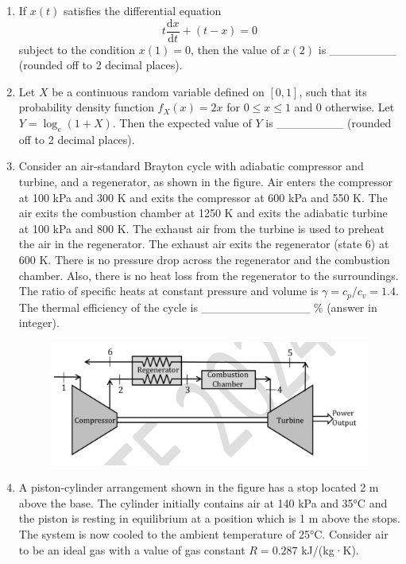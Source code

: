 \documentclass[journal,11pt,onecolumn]{IEEEtran}
\begin{document}
\begin{enumerate}[resume]
    \item If $x(t)$ satisfies the differential equation
    \[
    t\frac{\mathrm{d}x}{\mathrm{d}t} + (t-x)=0
    \] subject to the condition $x(1) = 0$, then the value of $x(2)$ is \_\_\_\_\_\_\_\_ (rounded off to 2 decimal places).

    \item Let $X$ be a continuous random variable defined on $[0, 1]$, such that its probability density function $f_X(x) = 2x$ for $0 \leq x \leq 1$ and 0 otherwise. Let $Y = \log_e(1 + X)$. Then the expected value of $Y$ is \_\_\_\_\_\_\_\_ (rounded off to 2 decimal places).

    \item Consider an air-standard Brayton cycle with adiabatic compressor and turbine, and a regenerator, as shown in the figure. Air enters the compressor at 100 kPa and 300 K and exits the compressor at 600 kPa and 550 K. The air exits the combustion chamber at 1250 K and exits the adiabatic turbine at 100 kPa and 800 K. The exhaust air from the turbine is used to preheat the air in the regenerator. The exhaust air exits the regenerator (state 6) at 600 K. There is no pressure drop across the regenerator and the combustion chamber. Also, there is no heat loss from the regenerator to the surroundings. The ratio of specific heats at constant pressure and volume is $\gamma = c_p/c_v = 1.4$. The thermal efficiency of the cycle is \_\_\_\_\_\_\_\_\_\_\_\_\_ \% (answer in integer).

          \begin{figure}[H]
              \centering
              \includegraphics[scale=0.2]{q45}
              \caption{}
              \label{fig:q45}
          \end{figure}

    \item A piston-cylinder arrangement shown in the figure has a stop located 2 m above the base. The cylinder initially contains air at 140 kPa and 35°C and the piston is resting in equilibrium at a position which is 1 m above the stops. The system is now cooled to the ambient temperature of 25°C. Consider air to be an ideal gas with a value of gas constant $R = 0.287$ kJ/(kg·K).


\end{enumerate}
\end{document}
